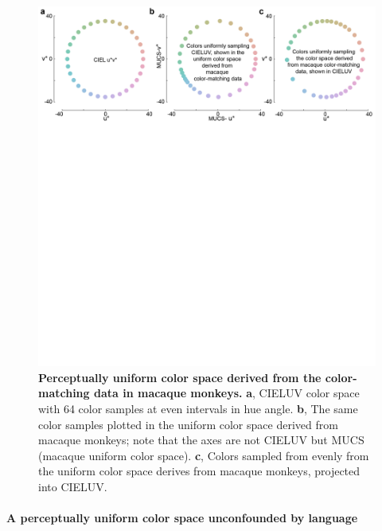 \begin{figure}
    \begin{fullwidth}
    \centering
      \includegraphics[width=\textwidth+4cm,trim={0 15cm 0 0},clip]{../Figures/flat/F6_ColSpace_2}
           \caption{\textbf{Perceptually uniform color space derived from the color-matching data in macaque monkeys.} 
			\textbf{a}, CIELUV color space with 64 color samples at even intervals in hue angle. 
			\textbf{b}, The same color samples plotted in the uniform color space derived from macaque monkeys; note that the axes are not CIELUV but MUCS (macaque uniform color space). 
			\textbf{c}, Colors sampled from evenly from the uniform color space derives from macaque monkeys, projected into CIELUV.}
		\label{fig:MACBEHcolorspace}
    \end{fullwidth}
\end{figure}


\paragraph{A perceptually uniform color space unconfounded by language}


